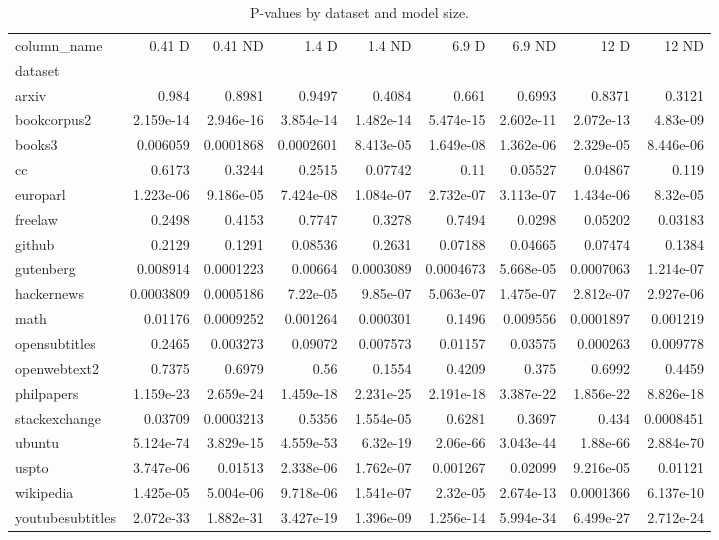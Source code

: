 \begin{table}
\caption{P-values by dataset and model size.}
\label{tab:pvalues_combined}
\begin{tabular}{lrrrrrrrr}
\toprule
column_name & 0.41 D & 0.41 ND & 1.4 D & 1.4 ND & 6.9 D & 6.9 ND & 12 D & 12 ND \\
dataset &  &  &  &  &  &  &  &  \\
\midrule
arxiv & 0.984 & 0.8981 & 0.9497 & 0.4084 & 0.661 & 0.6993 & 0.8371 & 0.3121 \\
bookcorpus2 & 2.159e-14 & 2.946e-16 & 3.854e-14 & 1.482e-14 & 5.474e-15 & 2.602e-11 & 2.072e-13 & 4.83e-09 \\
books3 & 0.006059 & 0.0001868 & 0.0002601 & 8.413e-05 & 1.649e-08 & 1.362e-06 & 2.329e-05 & 8.446e-06 \\
cc & 0.6173 & 0.3244 & 0.2515 & 0.07742 & 0.11 & 0.05527 & 0.04867 & 0.119 \\
europarl & 1.223e-06 & 9.186e-05 & 7.424e-08 & 1.084e-07 & 2.732e-07 & 3.113e-07 & 1.434e-06 & 8.32e-05 \\
freelaw & 0.2498 & 0.4153 & 0.7747 & 0.3278 & 0.7494 & 0.0298 & 0.05202 & 0.03183 \\
github & 0.2129 & 0.1291 & 0.08536 & 0.2631 & 0.07188 & 0.04665 & 0.07474 & 0.1384 \\
gutenberg & 0.008914 & 0.0001223 & 0.00664 & 0.0003089 & 0.0004673 & 5.668e-05 & 0.0007063 & 1.214e-07 \\
hackernews & 0.0003809 & 0.0005186 & 7.22e-05 & 9.85e-07 & 5.063e-07 & 1.475e-07 & 2.812e-07 & 2.927e-06 \\
math & 0.01176 & 0.0009252 & 0.001264 & 0.000301 & 0.1496 & 0.009556 & 0.0001897 & 0.001219 \\
opensubtitles & 0.2465 & 0.003273 & 0.09072 & 0.007573 & 0.01157 & 0.03575 & 0.000263 & 0.009778 \\
openwebtext2 & 0.7375 & 0.6979 & 0.56 & 0.1554 & 0.4209 & 0.375 & 0.6992 & 0.4459 \\
philpapers & 1.159e-23 & 2.659e-24 & 1.459e-18 & 2.231e-25 & 2.191e-18 & 3.387e-22 & 1.856e-22 & 8.826e-18 \\
stackexchange & 0.03709 & 0.0003213 & 0.5356 & 1.554e-05 & 0.6281 & 0.3697 & 0.434 & 0.0008451 \\
ubuntu & 5.124e-74 & 3.829e-15 & 4.559e-53 & 6.32e-19 & 2.06e-66 & 3.043e-44 & 1.88e-66 & 2.884e-70 \\
uspto & 3.747e-06 & 0.01513 & 2.338e-06 & 1.762e-07 & 0.001267 & 0.02099 & 9.216e-05 & 0.01121 \\
wikipedia & 1.425e-05 & 5.004e-06 & 9.718e-06 & 1.541e-07 & 2.32e-05 & 2.674e-13 & 0.0001366 & 6.137e-10 \\
youtubesubtitles & 2.072e-33 & 1.882e-31 & 3.427e-19 & 1.396e-09 & 1.256e-14 & 5.994e-34 & 6.499e-27 & 2.712e-24 \\
\bottomrule
\end{tabular}
\end{table}
